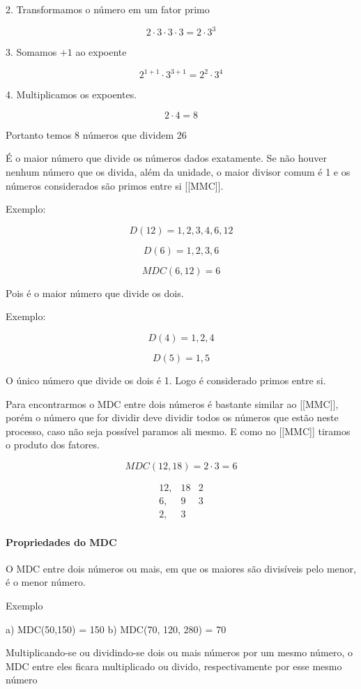 \documentclass[letterpaper]{book}
\begin{document}
2. Transformamos o número em um fator primo

\[2 \cdot 3 \cdot 3 \cdot 3 = 2 \cdot 3^{3}\]

3. Somamos \(+1\) ao expoente

\[2^{1+1} \cdot 3^{3+1} = 2^{2} \cdot 3^{4}\]

4. Multiplicamos os expoentes.

\[2 \cdot 4 = 8\]

Portanto temos 8 números que dividem 26

É o maior número que divide os números dados exatamente. Se não houver nenhum número que os divida, além da unidade, o maior divisor comum é 1 e os números considerados são primos entre si [[MMC]].

Exemplo:

\[D(12) = {1,2,3,4,6,12}\]

\[D(6) = {1,2,3,6}\]

\[MDC(6,12) = 6\]

Pois é o maior número que divide os dois.

Exemplo:

\[D(4) = {1,2,4}\]

\[D(5) = {1,5}\]

O único número que divide os dois é 1. Logo é considerado primos entre si.

Para encontrarmos o MDC entre dois números é bastante similar ao [[MMC]], porém o número que for dividir deve dividir todos os números que estão neste processo, caso não seja possível paramos ali mesmo. E como no [[MMC]] tiramos o produto dos fatores.

\[MDC(12, 18) = 2 \cdot 3 = 6\]

\[
\begin{array}{cc|cc} 
12, & 18 & 2 \\
 6, & 9  & 3 \\
 2, & 3  
\end{array}
\]

\paragraph{Propriedades do MDC}

O MDC entre dois números ou mais, em que os maiores são divisíveis pelo menor, é o menor número.

Exemplo

a) MDC(50,150) = 150
b) MDC(70, 120, 280) = 70

Multiplicando-se ou dividindo-se dois ou mais números por um mesmo número, o MDC entre eles ficara multiplicado ou divido, respectivamente por esse mesmo número
\end{document}
